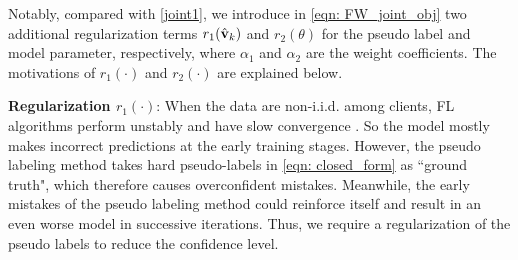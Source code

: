 \documentclass[twoside,journal]{IEEEtran}
\def\VectorFont{\bf}
\newcommand{\vv}{{\VectorFont v}}
\begin{document}
Notably, compared with \eqref{joint1}, we introduce in \eqref{eqn: FW_joint_obj} two additional regularization terms
$r_1(\hat{\vv}_k)$ and $r_2(\theta)$ for the pseudo label and model parameter, respectively, where $\alpha_1$ and $\alpha_2$ are the weight coefficients. The motivations of $r_1(\cdot)$ and $r_2(\cdot)$ are explained below.

\textbf{Regularization $r_1(\cdot)$}: When the data are non-i.i.d. among clients, FL algorithms perform unstably and have slow convergence \cite{karimireddy2020scaffold}. So the model mostly makes incorrect predictions
 at the early training stages. However, the pseudo labeling method takes hard pseudo-labels in \eqref{eqn: closed_form} as ``ground truth", which therefore causes overconfident mistakes. Meanwhile, the early mistakes of the pseudo labeling method could reinforce itself and result in an even worse model in successive iterations. Thus, we require a regularization of the pseudo labels to reduce the confidence level.
\end{document}
